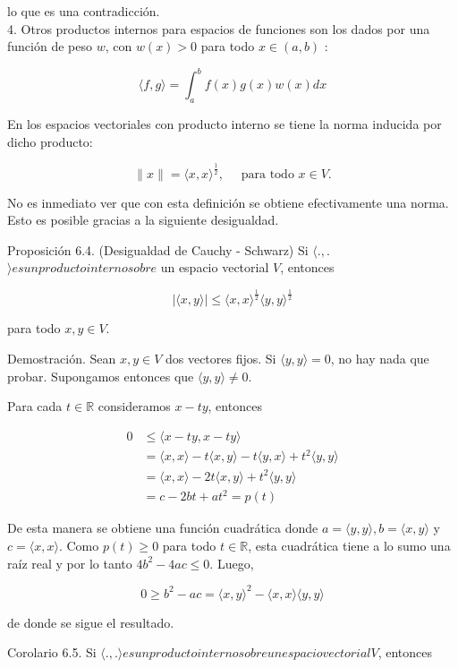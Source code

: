 \documentclass[10pt]{article}
\begin{document}
lo que es una contradicción.\\
4. Otros productos internos para espacios de funciones son los dados por una función de peso $w$, con $w(x)>0$ para todo $x \in(a, b)$ :

$$
\langle f, g\rangle=\int_{a}^{b} f(x) g(x) w(x) d x
$$

En los espacios vectoriales con producto interno se tiene la norma inducida por dicho producto:

$$
\|x\|=\langle x, x\rangle^{\frac{1}{2}}, \quad \text { para todo } x \in V .
$$

No es inmediato ver que con esta definición se obtiene efectivamente una norma. Esto es posible gracias a la siguiente desigualdad.

Proposición 6.4. (Desigualdad de Cauchy - Schwarz) Si $\langle.,$.$\rangle es un producto interno sobre$ un espacio vectorial $V$, entonces

$$
|\langle x, y\rangle| \leq\langle x, x\rangle^{\frac{1}{2}}\langle y, y\rangle^{\frac{1}{2}}
$$

para todo $x, y \in V$.

Demostración. Sean $x, y \in V$ dos vectores fijos. Si $\langle y, y\rangle=0$, no hay nada que probar. Supongamos entonces que $\langle y, y\rangle \neq 0$.

Para cada $t \in \mathbb{R}$ consideramos $x-t y$, entonces

$$
\begin{aligned}
0 & \leq\langle x-t y, x-t y\rangle \\
& =\langle x, x\rangle-t\langle x, y\rangle-t\langle y, x\rangle+t^{2}\langle y, y\rangle \\
& =\langle x, x\rangle-2 t\langle x, y\rangle+t^{2}\langle y, y\rangle \\
& =c-2 b t+a t^{2}=p(t)
\end{aligned}
$$

De esta manera se obtiene una función cuadrática donde $a=\langle y, y\rangle, b=\langle x, y\rangle$ y $c=\langle x, x\rangle$. Como $p(t) \geq 0$ para todo $t \in \mathbb{R}$, esta cuadrática tiene a lo sumo una raíz real y por lo tanto $4 b^{2}-4 a c \leq 0$. Luego,

$$
0 \geq b^{2}-a c=\langle x, y\rangle^{2}-\langle x, x\rangle\langle y, y\rangle
$$

de donde se sigue el resultado.

Corolario 6.5. Si $\langle.,$.$\rangle es un producto interno sobre un espacio vectorial V$, entonces
\end{document}
